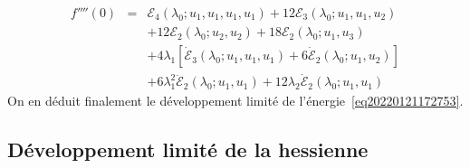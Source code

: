 \documentclass{article}
\begin{document}
\begin{eqnarray}
  f'''' (0) & = & \mathcal{E}_4 (\lambda_0 ; u_1, u_1, u_1, u_1) +
  12\mathcal{E}_3 (\lambda_0 ; u_1, u_1, u_2) \nonumber\\
  &  & + 12\mathcal{E}_2 (\lambda_0 ; u_2, u_2) + 18\mathcal{E}_2 (\lambda_0
  ; u_1, u_3) \nonumber\\
  &  & + 4 \lambda_1  [\dot{\mathcal{E}}_3 (\lambda_0 ; u_1, u_1, u_1) + 6
  \dot{\mathcal{E}}_2 (\lambda_0 ; u_1, u_2)] \nonumber\\
  &  & + 6 \lambda_1^2  \ddot{\mathcal{E}}_2 (\lambda_0 ; u_1, u_1) + 12
  \lambda_2  \dot{\mathcal{E}}_2 (\lambda_0 ; u_1, u_1) 
\end{eqnarray}
On en d{\'e}duit finalement le d{\'e}veloppement limit{\'e} de
l'{\'e}nergie~\eqref{eq20220121172753}.

\subsection{D{\'e}veloppement limit{\'e} de la
hessienne}\label{sec20211115081016}
\end{document}
